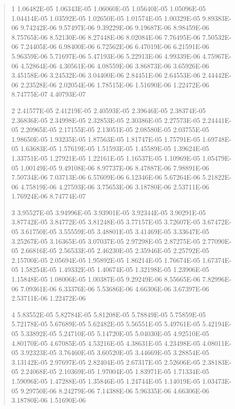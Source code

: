 \documentclass[letterpaper,10pt,english]{sphinxmanual}
\begin{document}
\begin{quote}
\begin{DUlineblock}{0em}
\item[]
\begin{DUlineblock}{\DUlineblockindent}
\item[] 1   1.06482E-05  1.06343E-05  1.06060E-05  1.05640E-05  1.05096E-05  1.04414E-05  1.03592E-05  1.02650E-05  1.01574E-05  1.00329E-05  9.89383E-06  9.74242E-06  9.57497E-06  9.39229E-06  9.19687E-06  8.98459E-06  8.75765E-06  8.52130E-06  8.27448E-06  8.02084E-06  7.76495E-06  7.50532E-06  7.24405E-06  6.98400E-06  6.72562E-06  6.47019E-06  6.21591E-06  5.96359E-06  5.71697E-06  5.47193E-06  5.22913E-06  4.99339E-06  4.75967E-06  4.52864E-06  4.30561E-06  4.08559E-06  3.86873E-06  3.65926E-06  3.45158E-06  3.24532E-06  3.04400E-06  2.84451E-06  2.64553E-06  2.44442E-06  2.23528E-06  2.02054E-06  1.78515E-06  1.51690E-06  1.22472E-06  8.74775E-07  4.40793E-07
\item[] 2   2.41577E-05  2.41219E-05  2.40593E-05  2.39646E-05  2.38374E-05  2.36836E-05  2.34998E-05  2.32853E-05  2.30386E-05  2.27573E-05  2.24441E-05  2.20965E-05  2.17155E-05  2.13051E-05  2.08580E-05  2.03755E-05  1.98650E-05  1.93235E-05  1.87563E-05  1.81747E-05  1.75791E-05  1.69748E-05  1.63683E-05  1.57619E-05  1.51593E-05  1.45589E-05  1.39624E-05  1.33751E-05  1.27921E-05  1.22161E-05  1.16537E-05  1.10969E-05  1.05479E-05  1.00149E-05  9.49108E-06  8.97737E-06  8.47887E-06  7.98891E-06  7.50734E-06  7.03713E-06  6.57609E-06  6.12346E-06  5.67264E-06  5.21822E-06  4.75819E-06  4.27593E-06  3.75653E-06  3.18780E-06  2.53711E-06  1.76924E-06  8.74774E-07
\item[] 3   3.95527E-05  3.94996E-05  3.93901E-05  3.92344E-05  3.90291E-05  3.87742E-05  3.84772E-05  3.81248E-05  3.77157E-05  3.72607E-05  3.67472E-05  3.61750E-05  3.55559E-05  3.48801E-05  3.41469E-05  3.33647E-05  3.25267E-05  3.16365E-05  3.07037E-05  2.97298E-05  2.87275E-05  2.77090E-05  2.66816E-05  2.56533E-05  2.46230E-05  2.35946E-05  2.25792E-05  2.15700E-05  2.05694E-05  1.95892E-05  1.86214E-05  1.76674E-05  1.67374E-05  1.58254E-05  1.49332E-05  1.40674E-05  1.32198E-05  1.23906E-05  1.15848E-05  1.08006E-05  1.00387E-05  9.29249E-06  8.55665E-06  7.82996E-06  7.09361E-06  6.33376E-06  5.53686E-06  4.66306E-06  3.67397E-06  2.53711E-06  1.22472E-06
\item[] 4   5.83552E-05  5.82784E-05  5.81208E-05  5.78849E-05  5.75859E-05  5.72178E-05  5.67689E-05  5.62482E-05  5.56551E-05  5.49761E-05  5.42194E-05  5.33892E-05  5.24710E-05  5.14720E-05  5.04030E-05  4.92510E-05  4.80170E-05  4.67085E-05  4.53216E-05  4.38631E-05  4.23498E-05  4.08011E-05  3.92323E-05  3.76460E-05  3.60520E-05  3.44669E-05  3.28854E-05  3.13142E-05  2.97697E-05  2.82404E-05  2.67317E-05  2.52606E-05  2.38183E-05  2.24068E-05  2.10369E-05  1.97004E-05  1.83971E-05  1.71334E-05  1.59096E-05  1.47288E-05  1.35846E-05  1.24744E-05  1.14019E-05  1.03473E-05  9.29750E-06  8.24279E-06  7.14388E-06  5.96335E-06  4.66306E-06  3.18780E-06  1.51690E-06

\end{DUlineblock}
\end{DUlineblock}
\end{quote}
\end{document}
